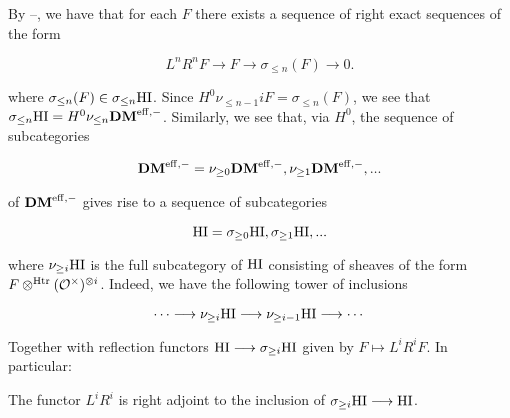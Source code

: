 \newcommand{\olDM}[1]{\sigma_{\leq #1}}
\newcommand{\ogDM}[1]{\sigma_{\geq #1}}
\newcommand{\nlDM}[1]{\nu_{\leq #1}}
\newcommand{\ngDM}[1]{\nu_{\geq #1}}
\newcommand{\ohomeHI}[0]{\underline{Hom}_{\sigma \geq i\HI}}
\newcommand{\torT}[0]{\mathbb{T}}
\newcommand{\torF}[0]{\mathbb{F}}
\newcommand{\xlongrightarrow}[1]{\stackrel{#1}{\longrightarrow}}
\newcommand{\homTorTn}[0]{\mathrm{Hom}_{\torT_n}}

By --, we have that for each $F$ there exists a sequence of right 
exact sequences of the form 

\begin{equation}
L^nR^n F \longrightarrow F \longrightarrow \olDM{n}(F)
\longrightarrow 0.
\end{equation}

where $\olDM{n}(F) \in \olDM{n} \HI$. Since $H^0 \nlDM{n-1} iF = 
\olDM{n}(F)$, we see that $\olDM{n}\HI=H^0\nlDM{n}\DMm$. 
Similarly, we see that, via $H^0$, the sequence of subcategories

\begin{equation}
\DMm=\ngDM{0}\DMm,\ngDM{1}\DMm,... 
\end{equation}

of $\mathbf{DM}^{\mathrm{eff},-}$ gives rise to a sequence of subcategories

\begin{equation}
\HI=\ogDM{0} \HI, \ogDM{1} \HI, ...
\end{equation}

where $\ngDM{i} \HI$ is the full subcategory of $\mathrm{HI}$ consisting 
of sheaves of the form $F \otimes^{\mathrm{Htr}} (\mathcal{O}^{\times})^{\otimes i}$. Indeed, we have 
the following tower of inclusions

\begin{equation}
\cdots \longrightarrow \ngDM{i} \HI \longrightarrow \ngDM{i-1} \HI 
\longrightarrow \cdots
\end{equation}

Together with reflection functors $\HI \longrightarrow \ogDM{i} 
\HI$ given by $F \mapsto L^iR^i F$. In particular:

\begin{prop}\label{functer_prop}
The functor $L^iR^i$ is right adjoint to the inclusion of $\ogDM{i} 
\HI \longrightarrow \HI$.
\end{prop}

